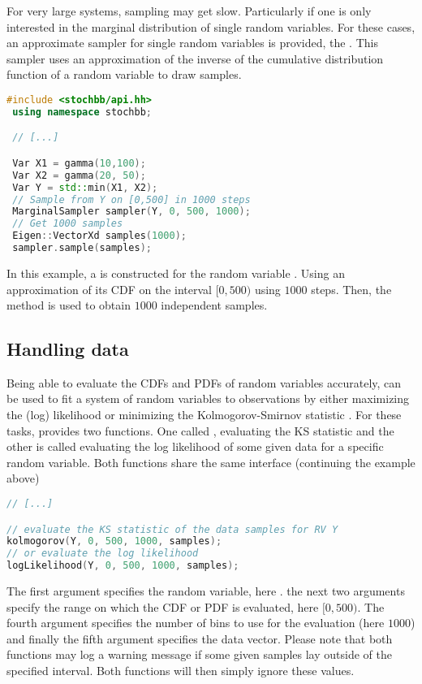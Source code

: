 For very large systems, sampling may get slow. Particularly if one is only interested
in the marginal distribution of single random variables. For these cases, an approximate sampler
for single random variables is provided, the . This sampler uses an
approximation of the inverse of the cumulative distribution function of a random variable
to draw samples.
\begin{lstlisting}[language=C++]
 #include <stochbb/api.hh>
 using namespace stochbb;

 // [...]

 Var X1 = gamma(10,100);
 Var X2 = gamma(20, 50);
 Var Y = std::min(X1, X2);
 // Sample from Y on [0,500] in 1000 steps
 MarginalSampler sampler(Y, 0, 500, 1000);
 // Get 1000 samples
 Eigen::VectorXd samples(1000);
 sampler.sample(samples);
\end{lstlisting}

In this example, a  is constructed for the random variable . Using an
approximation of its CDF on the interval $[0,500)$ using $1000$ steps. Then, the
 method is used to obtain $1000$ independent samples.

\subsection{Handling data}
Being able to evaluate the CDFs and PDFs of random variables accurately,  can be
used to fit a system of random variables to observations by either maximizing the (log) likelihood
or minimizing the Kolmogorov-Smirnov statistic \cite[KS; e.g.,][]{Marsaglia2003}. For these tasks,
 provides two functions. One called , evaluating the KS statistic
and the other is called  evaluating the log likelihood of some given data for
a specific random variable. Both functions share the same interface (continuing the example above)

\begin{lstlisting}[language=C++]
// [...]

// evaluate the KS statistic of the data samples for RV Y
kolmogorov(Y, 0, 500, 1000, samples);
// or evaluate the log likelihood
logLikelihood(Y, 0, 500, 1000, samples);
\end{lstlisting}

The first argument specifies the random variable, here . the next two arguments specify
the range on which the CDF or PDF is evaluated, here $[0,500)$. The fourth argument specifies the
number of bins to use for the evaluation (here $1000$) and finally the fifth argument specifies
the data vector. Please note that both functions may log a warning message if some given samples
lay outside of the specified interval. Both functions will then simply ignore these values.